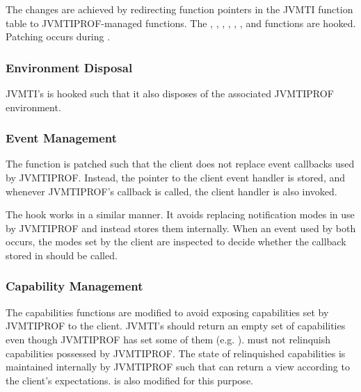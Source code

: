 The changes are achieved by redirecting function pointers in the JVMTI function table to JVMTIPROF-managed functions. The , , , , , ,  and  functions are hooked. Patching occurs during .

\subsubsection*{Environment Disposal}

JVMTI's  is hooked such that it also disposes of the associated JVMTIPROF environment.

\subsubsection*{Event Management}

The  function is patched such that the client does not replace event callbacks used by JVMTIPROF. Instead, the pointer to the client event handler is stored, and whenever JVMTIPROF's callback is called, the client handler is also invoked.

The  hook works in a similar manner. It avoids replacing notification modes in use by JVMTIPROF and instead stores them internally. When an event used by both occurs, the modes set by the client are inspected to decide whether the callback stored in  should be called.

\subsubsection*{Capability Management}

The capabilities functions are modified to avoid exposing capabilities set by JVMTIPROF to the client. JVMTI's  should return an empty set of capabilities even though JVMTIPROF has set some of them (e.g. ).  must not relinquish capabilities possessed by JVMTIPROF. The state of relinquished capabilities is maintained internally by JVMTIPROF such that  can return a view according to the client's expectations.  is also modified for this purpose.

